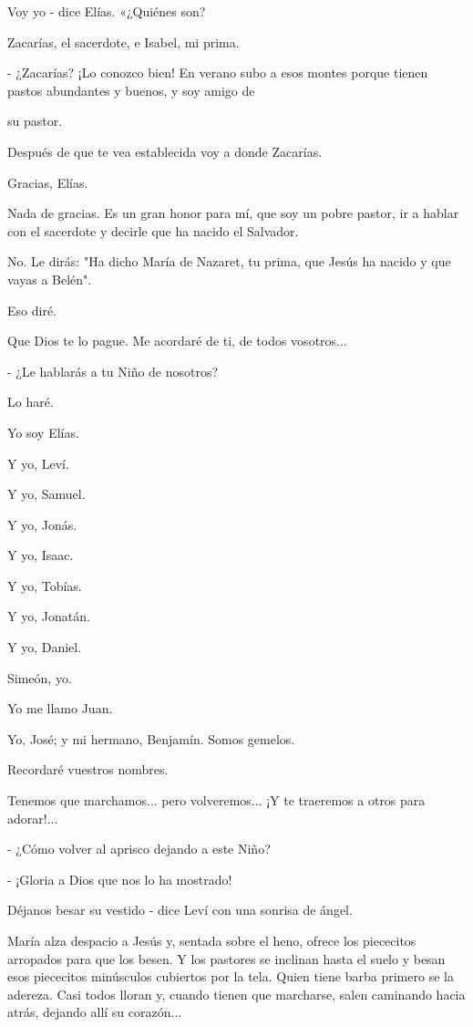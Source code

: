 \documentclass[12pt, twoside, openright]{book} %
\begin{document}
Voy yo - dice Elías. «¿Quiénes son? 

Zacarías, el sacerdote, e Isabel, mi prima. 

- ¿Zacarías? ¡Lo conozco bien! En verano subo a esos montes porque tienen pastos abundantes y buenos, y soy amigo de 

su pastor. 

Después de que te vea establecida voy a donde Zacarías. 

Gracias, Elías. 

Nada de gracias. Es un gran honor para mí, que soy un pobre pastor, ir a hablar con el sacerdote y decirle que ha nacido el Salvador. 

No. Le dirás: "Ha dicho María de Nazaret, tu prima, que Jesús ha nacido y que vayas a Belén". 

Eso diré. 

Que Dios te lo pague. Me acordaré de ti, de todos vosotros... 

- ¿Le hablarás a tu Niño de nosotros? 

Lo haré. 

Yo soy Elías. 

Y yo, Leví. 

Y yo, Samuel. 

Y yo, Jonás. 

Y yo, Isaac. 

Y yo, Tobías. 

Y yo, Jonatán. 

Y yo, Daniel. 

Simeón, yo. 

Yo me llamo Juan. 

Yo, José; y mi hermano, Benjamín. Somos gemelos. 

Recordaré vuestros nombres. 

Tenemos que marchamos... pero volveremos... ¡Y te traeremos a otros para adorar!... 

- ¿Cómo volver al aprisco dejando a este Niño? 

- ¡Gloria a Dios que nos lo ha mostrado! 

Déjanos besar su vestido - dice Leví con una sonrisa de ángel. 

María alza despacio a Jesús y, sentada sobre el heno, ofrece los piececitos arropados para que los besen. Y los pastores se inclinan hasta el suelo y besan esos piececitos minúsculos cubiertos por la tela. Quien tiene barba primero se la adereza. Casi todos lloran y, cuando tienen que marcharse, salen caminando hacia atrás, dejando allí su corazón... 
\end{document}
